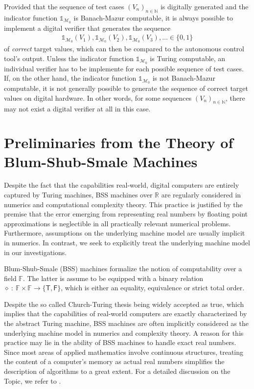 \documentclass[conference]{IEEEtran}
\def\M{{\mathcal M}}
\def\NN{{\mathbb N}}
\def\RR{{\mathbb R}}
\def\FF{{\mathbb F}}
\begin{document}
	Provided that the sequence of test cases \((V_n)_{n\in\NN}\) is digitally generated and the indicator function \(\mathds{1}_{\M_0}\) is Banach-Mazur computable, 
	it is always possible to implement a digital verifier that generates the sequence 
	\begin{align} 	\mathds{1}_{\M_0}(V_1), \mathds{1}_{\M_0}(V_2), \mathds{1}_{\M_0}(V_3),\ldots	\in \{0,1\} 
	\end{align}
	of \emph{correct} target values,
	which can then be compared to the autonomous control tool's output. Unless the indicator function \(\mathds{1}_{\M_0}\) is Turing computable, an individual verifier has to be implemente for each 
	possible sequence of test cases. If, on the other hand, the indicator function \(\mathds{1}_{\M_0}\) is not Banach-Mazur computable, it is not generally possible to generate the 
	sequence of correct target values on digital hardware. In other words, for some sequences \((V_n)_{n\in\NN}\), there may not exist a digital verifier at all in this case.

\section{Preliminaries from the Theory of Blum-Shub-Smale Machines}	\label{sec:PreliminariesBSS}	
	{\color{green} Despite the fact that the capabilities real-world, digital computers are 
	entirely captured by Turing machines, BSS machines over \(\RR\) are regularly considered in numerics and computational complexity theory. 
	This practice is justified by the premise that the error emerging from representing real numbers by floating point approximations is neglectible in all practically relevant numerical problems. 
	Furthermore, assumptions on the underlying machine model are usually implicit in numerics. In contrast, we seek to explicitly treat the underlying machine model in our investigations.}
			
	Blum-Shub-Smale (BSS) machines formalize the notion of computability over a field \(\FF\). The latter is assume to be equipped 
	with a binary relation \(\diamond~{:}~\FF \times \FF \rightarrow \{\mathsf{T},\mathsf{F}\}\), which is either an equality, equivalence or strict total order. 
	
	Despite the so called Church-Turing thesis being widely accepted as true, which implies that the capabilities of real-world computers are exactly characterized 
	by the abstract Turing machine, BSS machines are often implicitly considered as the underlying machine model in numerics and complexity theory. 
	A reason for this practice may lie in the ability of BSS machines to handle exact real numbers. Since most areas of applied mathematics involve continuous structures, 
	treating the content of a computer's memory as actual real numbers simplifies the description of algorithms to a great extent. For a detailed discussion on the Topic, we refer to \cite{Bl04}.
\end{document}
